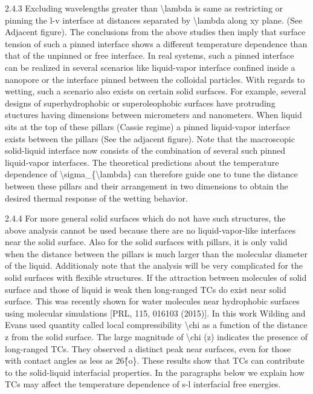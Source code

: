 \par 2.4.3  Excluding wavelengths greater than \textbackslash lambda is same as restricting or pinning the l-v interface at distances separated by \textbackslash lambda along xy plane. (See Adjacent figure). The conclusions from the above studies then imply that surface tension of such a pinned interface shows a different temperature dependence than that of the unpinned or free interface. In real systems, such a pinned interface can be realized in several scenarios like liquid-vapor interface confined inside a nanopore or the interface pinned between the colloidal particles. With regards to wetting, such a scenario also exists on certain solid surfaces. For example, several designs of superhydrophobic or superoleophobic surfaces have protruding stuctures having dimensions between micrometers and nanometers. When liquid sits at the top of these pillars (Cassie regime) a pinned liquid-vapor interface exists between the pillars (See the adjacent figure). Note that the macroscopic solid-liquid interface now consists of the combination of several such pinned liquid-vapor interfaces. The theoretical predictions about the temperature dependence of \textbackslash sigma\_\{\textbackslash lambda\} can therefore guide one to tune the distance between these pillars and their arrangement in two dimensions to obtain the desired thermal response of the wetting behavior.
\par 2.4.4 For more general solid surfaces which do not have such structures, the above analysis cannot be used because there are no liquid-vapor-like interfaces near the solid surface. Also for the solid surfaces with pillars, it is only valid when the distance between the pillars is much larger than the molecular diameter of the liquid. Additionaly note that the analysis will be very complicated for the solid surfaces with flexible structures. If the attraction between molecules of solid surface and those of liquid is weak then long-ranged TCs do exist near solid surface. This was recently shown for water molecules near hydrophobic surfaces using molecular simulations [PRL, 115, 016103 (2015)]. In this work Wilding and Evans used quantity called local compressibility \textbackslash chi as a function of the distance z from the solid surface. The large magnitude of \textbackslash chi (z) indicates the presence of long-ranged TCs. They observed a distinct peak near surfaces, even for those with contact angles as less as 26\^\{o\}. These results show that TCs can contribute to the solid-liquid interfacial properties. In the paragraphs below we explain how TCs may affect the temperature dependence of  s-l interfacial free energies.
